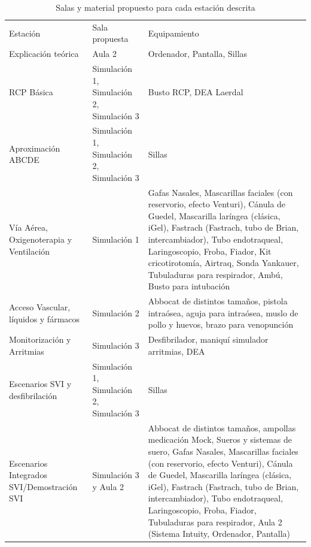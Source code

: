 \begin{table}[hptb]
    \centering
    \begin{tabular}{N{0.24\textwidth}N{0.15\textwidth}M{0.54\textwidth}}
        {\color[HTML]{FFFFFF} Estación} & {\color[HTML]{FFFFFF} Sala propuesta} & {\color[HTML]{FFFFFF} Equipamiento} \\
        Explicación teórica & Aula 2 & Ordenador, Pantalla, Sillas \\
        RCP Básica & Simulación 1, Simulación 2, Simulación 3 & Busto RCP, DEA Laerdal \\
        Aproximación ABCDE & Simulación 1, Simulación 2, Simulación 3 & Sillas \\
        Vía Aérea, Oxigenoterapia y Ventilación & Simulación 1 & Gafas Nasales, Mascarillas faciales (con reservorio, efecto Venturi), Cánula de Guedel, Mascarilla laríngea (clásica, iGel), Fastrach (Fastrach, tubo de Brian, intercambiador), Tubo endotraqueal, Laringoscopio, Froba, Fiador, Kit cricotirotomía, Airtraq, Sonda Yankauer, Tubuladuras para respirador, Ambú, Busto para intubación \\
        Acceso Vascular, líquidos y fármacos & Simulación 2 & Abbocat de distintos tamaños, pistola intraósea, aguja para intraósea, muslo de pollo y huevos, brazo para venopunción \\
        Monitorización y Arritmias & Simulación 3 & Desfibrilador, maniquí simulador arritmias, DEA \\
        Escenarios SVI y desfibrilación & Simulación 1, Simulación 2, Simulación 3 & Sillas \\
        Escenarios Integrados SVI/Demostración SVI & Simulación 3 y Aula 2 & Abbocat de distintos tamaños, ampollas medicación Mock, Sueros y sistemas de suero, Gafas Nasales, Mascarillas faciales (con reservorio, efecto Venturi), Cánula de Guedel, Mascarilla laríngea (clásica, iGel), Fastrach (Fastrach, tubo de Brian, intercambiador), Tubo endotraqueal, Laringoscopio, Froba, Fiador, Tubuladuras para respirador, Aula 2 (Sistema Intuity, Ordenador, Pantalla) \\ \hline
    \end{tabular}
    \caption{Salas y material propuesto para cada estación descrita}
    \label{tab:Brusilov:SVI:SalasEstaciones}
\end{table}

